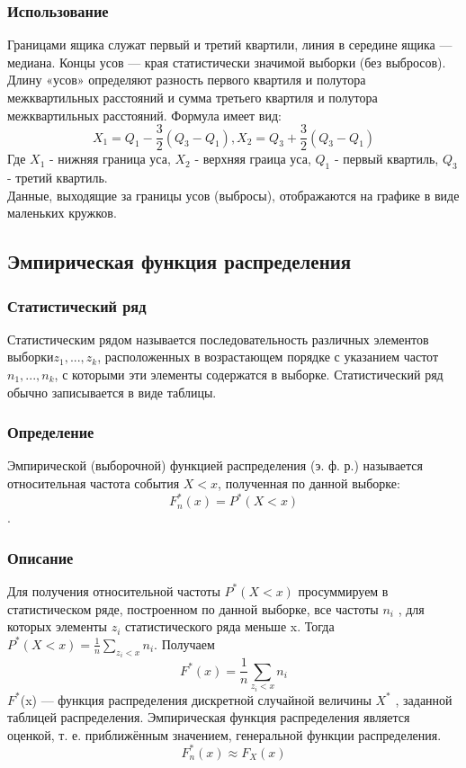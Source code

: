 \documentclass[a4]{article}
\begin{document}
			\subsubsection{Использование}
			Границами ящика служат первый и третий квартили, линия в середине
			ящика — медиана. Концы усов — края статистически значимой выборки
			(без выбросов). Длину «усов» определяют разность первого квартиля и полутора межквартильных расстояний и сумма третьего квартиля и полутора
			межквартильных расстояний. Формула имеет вид:\\
			$$X_1 = Q_1 - \frac{3}{2}(Q_3 - Q_1), X_2 = Q_3 + \frac{3}{2}(Q_3 - Q_1)$$
			Где $X_1$ - нижняя граница уса, $X_2$ - верхняя граица уса, $Q_1$ - первый квартиль, $Q_3$ - третий квартиль.\\
			Данные, выходящие за границы усов (выбросы), отображаются на графике
			в виде маленьких кружков.
				
			\subsection{Эмпирическая функция распределения}
			\subsubsection{Статистический ряд}
			Статистическим рядом называется последовательность различных элементов выборки$ z_1, ... , z_k$, расположенных в возрастающем порядке с указанием частот $n_1, ... , n_k$, с которыми эти элементы содержатся в выборке.
			Статистический ряд обычно записывается в виде таблицы.
			\subsubsection{Определение}
			Эмпирической (выборочной) функцией распределения (э. ф. р.) называется
			относительная частота события $X < x$, полученная по данной выборке:
			$$F^*_n(x) = P^*(X<x)$$.
			\subsubsection{Описание}
			Для получения относительной частоты $P^*(X<x)$ просуммируем в статистическом ряде, построенном по данной выборке, все частоты $n_i$ , для
			которых элементы $z_i$ статистического ряда меньше x. Тогда $P^*(X<x) = \frac{1}{n}\sum_{z_i<x}n_i $. Получаем\\
			$$F^*(x) = \frac{1}{n}\sum_{z_i<x}n_i$$
			$F^*$(x) — функция распределения дискретной случайной величины $X^*$
			, заданной таблицей распределения.
			Эмпирическая функция распределения является оценкой, т. е. приближённым значением, генеральной функции распределения.
			$$F^*_n(x) \approx F_X(x)$$
			
\end{document}
